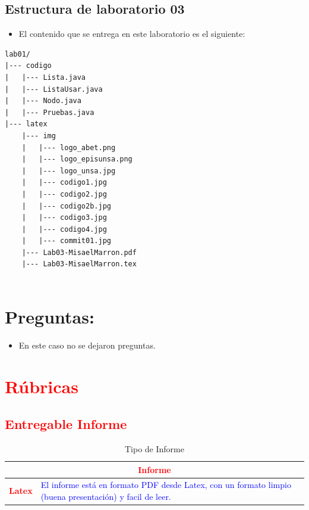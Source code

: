 \documentclass{article}
\begin{document}
	
	
	\subsection{Estructura de laboratorio 03}
	\begin{itemize}	
		\item El contenido que se entrega en este laboratorio es el siguiente:
	\end{itemize}
	
\begin{lstlisting}[style=ascii-tree]
lab01/
|--- codigo
|   |--- Lista.java
|   |--- ListaUsar.java
|   |--- Nodo.java
|   |--- Pruebas.java
|--- latex
    |--- img
    |   |--- logo_abet.png
    |   |--- logo_episunsa.png
    |   |--- logo_unsa.jpg
    |   |--- codigo1.jpg
    |   |--- codigo2.jpg
    |   |--- codigo2b.jpg
    |   |--- codigo3.jpg
    |   |--- codigo4.jpg
    |   |--- commit01.jpg
    |--- Lab03-MisaelMarron.pdf    
    |--- Lab03-MisaelMarron.tex
    
\end{lstlisting}    

\section{Preguntas: }
	\begin{itemize}
		\item En este caso no se dejaron preguntas.
	\end{itemize}	
		
	\section{\textcolor{red}{Rúbricas}}
	
	\subsection{\textcolor{red}{Entregable Informe}}
	\begin{table}[H]
		\caption{Tipo de Informe}
		\setlength{\tabcolsep}{0.5em} %
		{\renewcommand{\arraystretch}{1.5}%
		\begin{tabular}{|p{3cm}|p{12cm}|}
			\hline
			\multicolumn{2}{|c|}{\textbf{\textcolor{red}{Informe}}}  \\
			\hline 
			\textbf{\textcolor{red}{Latex}} & \textcolor{blue}{El informe está en formato PDF desde Latex,  con un formato limpio (buena presentación) y facil de leer.}   \\ 
			\hline 
			
			
		\end{tabular}
	}
	\end{table}
	
\end{document}
